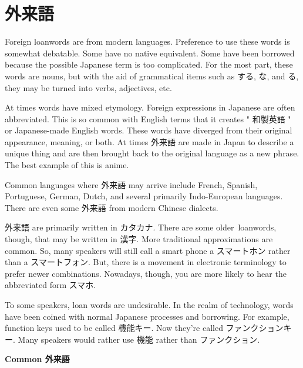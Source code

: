 \section{外来語}
 
\par{ Foreign loanwords are from modern languages. Preference to use these words is somewhat debatable.  Some have no native equivalent. Some have  been borrowed because the possible Japanese term is too complicated. For the most part, these words are nouns, but with the aid of grammatical items such as する, な, and る, they may be turned into verbs, adjectives, etc. }

\par{At times words have mixed etymology. Foreign expressions in Japanese are often abbreviated. This is so common with English terms that it creates " 和製英語  " or Japanese-made English words. These words have diverged from their original appearance, meaning, or both. At times 外来語 are  made in Japan to describe a unique thing and are then brought back to  the original language as a new phrase. The best example of this is  anime. }

\par{Common languages where 外来語 may arrive include French, Spanish, Portuguese, German, Dutch, and several primarily Indo-European languages. There are even some 外来語 from modern Chinese dialects. }

\par{外来語 are primarily written in カタカナ. There are some older loanwords, though, that may be written in 漢字. More traditional approximations are common. So, many speakers will still call a smart phone a スマートホン rather than a スマートフォン. But, there is a movement in electronic terminology to prefer newer combinations. Nowadays, though, you are more likely to hear the abbreviated form スマホ. }

\par{To some speakers, loan words are undesirable. In the realm of technology, words have been coined with normal Japanese processes and borrowing. For example, function keys used to be called 機能キー. Now they're called ファンクションキー. Many speakers would rather use 機能 rather than ファンクション. }

\par{\textbf{Common 外来語 }}

